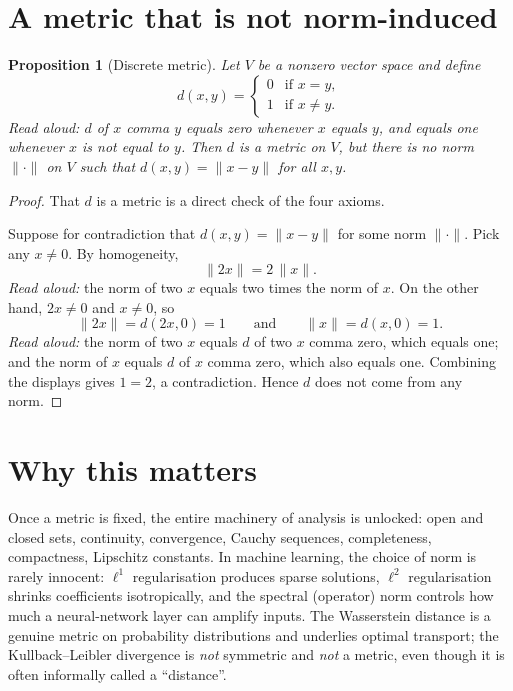 \documentclass[11pt]{article}
\theoremstyle{definition}
\theoremstyle{plain}
\newtheorem{proposition}[theorem]{Proposition}
\begin{document}
\section{A metric that is not norm-induced}

\begin{proposition}[Discrete metric]
\label{prop:discrete}
Let $V$ be a nonzero vector space and define
\[
  d(x,y) =
  \begin{cases}
    0 & \text{if } x = y, \\
    1 & \text{if } x \ne y.
  \end{cases}
\]
\emph{Read aloud:} $d$ of $x$ comma $y$ equals zero whenever $x$ equals
$y$, and equals one whenever $x$ is not equal to $y$.
Then $d$ is a metric on $V$, but there is no norm $\|\cdot\|$ on $V$
such that $d(x,y) = \|x - y\|$ for all $x,y$.
\end{proposition}

\begin{proof}
That $d$ is a metric is a direct check of the four axioms.

Suppose for contradiction that $d(x,y) = \|x - y\|$ for some norm
$\|\cdot\|$. Pick any $x \ne 0$. By homogeneity,
\[
  \|2x\| = 2\,\|x\|.
\]
\emph{Read aloud:} the norm of two $x$ equals two times the norm of $x$.
On the other hand, $2x \ne 0$ and $x \ne 0$, so
\[
  \|2x\| = d(2x, 0) = 1 \qquad \text{and} \qquad
  \|x\|  = d(x, 0)  = 1.
\]
\emph{Read aloud:} the norm of two $x$ equals $d$ of two $x$ comma zero,
which equals one; and the norm of $x$ equals $d$ of $x$ comma zero,
which also equals one.
Combining the displays gives $1 = 2$, a contradiction.
Hence $d$ does not come from any norm.
\end{proof}

\section{Why this matters}

Once a metric is fixed, the entire machinery of analysis is unlocked:
open and closed sets, continuity, convergence, Cauchy sequences,
completeness, compactness, Lipschitz constants. In machine learning, the
choice of norm is rarely innocent: $\ell^1$ regularisation produces
sparse solutions, $\ell^2$ regularisation shrinks coefficients
isotropically, and the spectral (operator) norm controls how much a
neural-network layer can amplify inputs. The Wasserstein distance is a
genuine metric on probability distributions and underlies optimal
transport; the Kullback--Leibler divergence is \emph{not} symmetric and
\emph{not} a metric, even though it is often informally called a
``distance''.
\end{document}
